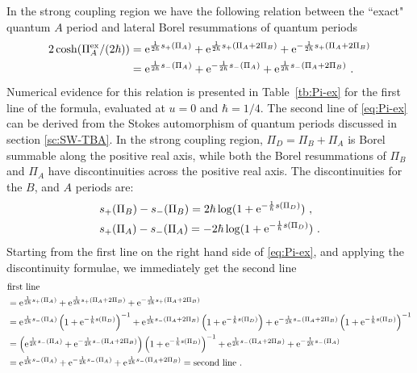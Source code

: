 \documentclass[a4paper,11pt]{article}
\theoremstyle{definition}
\newcommand{\re}{{\rm e}}
\def\({\left(}
\def\){\right)}
\newcommand{\nn}{\nonumber \\}
\begin{document}
In the strong coupling region we have the
following relation between the ``exact" quantum $A$ period and lateral 
Borel resummations of quantum periods \cite{kpt}
%
\begin{equation}\label{eq:Pi-ex}
\begin{aligned}
  2 \cosh(\Pi_A^{\text{ex}}/(2\hbar))
  &= \re^{\frac{1}{2\hbar}s_+(\Pi_A)} + \re^{\frac{1}{2\hbar}s_+(\Pi_A+2\Pi_B)}
  + \re^{-\frac{1}{2\hbar}s_+(\Pi_A+2\Pi_B)} \\
  &=\re^{\frac{1}{2\hbar}s_-(\Pi_A)} + \re^{-\frac{1}{2\hbar}s_-(\Pi_A)} +
    \re^{\frac{1}{2\hbar}s_-(\Pi_A+2\Pi_B)} \ .
  \end{aligned}
\end{equation}
%
Numerical evidence for this relation is presented in
Table~\ref{tb:Pi-ex} for the first line of the formula, evaluated at
$u=0$ and $\hbar=1/4$. 
The second line of \eqref{eq:Pi-ex} can be
derived from the Stokes automorphism of quantum periods discussed in
section \ref{sc:SW-TBA}.
In the strong coupling region, $\Pi_D=\Pi_B+\Pi_A$ is Borel summable
along the positive real axis, while both the Borel resummations of
$\Pi_B$ and $\Pi_A$ have discontinuities across the positive real
axis. The  discontinuities for the $B$, and $A$ periods
are:
%
\begin{equation}
  \begin{aligned}
    &s_+(\Pi_B) - s_-(\Pi_B) = 2\hbar \log
    (1+\re^{-\frac{1}{\hbar}s(\Pi_D)})\ ,\\
    &s_+(\Pi_A) - s_-(\Pi_A) = -2\hbar \log
    (1+\re^{-\frac{1}{\hbar}s(\Pi_D)}) \ .
  \end{aligned}
\end{equation}
%
Starting from the first line on the right hand side of
\eqref{eq:Pi-ex}, and applying the discontinuity formulae, we
immediately get the second line
%
\begin{align}
  &\text{first line}\nn
  &=
    \re^{\frac{1}{2\hbar}s_+(\Pi_A)} + \re^{\frac{1}{2\hbar}s_+(\Pi_A+2\Pi_B)}
    + \re^{-\frac{1}{2\hbar}s_+(\Pi_A+2\Pi_B)}
    \nn
  &=
    \re^{\frac{1}{2\hbar}s_-(\Pi_A)}\(1+\re^{-\frac{1}{\hbar}s(\Pi_D)}\)^{-1}
    + \re^{\frac{1}{2\hbar}s_-(\Pi_A+2\Pi_B)}\(1+\re^{-\frac{1}{\hbar}s(\Pi_D)}\)
    +
    \re^{-\frac{1}{2\hbar}s_-(\Pi_A+2\Pi_B)}
    \(1+\re^{-\frac{1}{\hbar}s(\Pi_D)}\)^{-1} 
    \nn
  &=
    \(\re^{\frac{1}{2\hbar}s_-(\Pi_A)}+\re^{-\frac{1}{2\hbar}s_-(\Pi_A+2\Pi_B)}\)
    \(1+\re^{-\frac{1}{\hbar}s(\Pi_D)}\)^{-1} +
    \re^{\frac{1}{2\hbar}s_-(\Pi_A+2\Pi_B)}+\re^{-\frac{1}{2\hbar}s_-(\Pi_A)}
    \nn
  &=
    \re^{\frac{1}{2\hbar}s_-(\Pi_A)}+\re^{-\frac{1}{2\hbar}s_-(\Pi_A)}
    +\re^{\frac{1}{2\hbar}s_-(\Pi_A+2\Pi_B)}  = \text{second line} \ .
\end{align}
\end{document}
